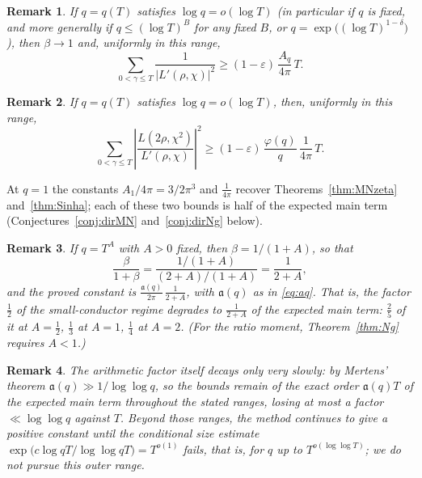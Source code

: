 \documentclass[10pt,a4paper]{amsart}
\newtheorem*{remark}{Remark}
\numberwithin{equation}{section}
\begin{document}
\begin{remark}
If $q=q(T)$ satisfies $\log q=o(\log T)$ (in particular if $q$ is fixed, and more generally if $q\le(\log T)^B$ for any fixed $B$, or $q=\exp\bigl((\log T)^{1-\delta}\bigr)$), then $\beta\to1$ and, uniformly in this range,
\[
\sum_{0<\gamma\le T}\frac{1}{|L'(\rho,\chi)|^2}\ge(1-\varepsilon)\,\frac{A_q}{4\pi}\,T .
\]
\end{remark}

\begin{remark}
If $q=q(T)$ satisfies $\log q=o(\log T)$, then, uniformly in this range,
\[
\sum_{0<\gamma\le T}\left|\frac{L(2\rho,\chi^2)}{L'(\rho,\chi)}\right|^2\ge(1-\varepsilon)\,\frac{\varphi(q)}{q}\,\frac{1}{4\pi}\,T .
\]
\end{remark}

At $q=1$ the constants $A_1/4\pi=3/2\pi^3$ and $\tfrac{1}{4\pi}$ recover Theorems~\ref{thm:MNzeta} and~\ref{thm:Sinha}; each of these two bounds is half of the expected main term (Conjectures~\ref{conj:dirMN} and~\ref{conj:dirNg} below).

\begin{remark}
If $q=T^{A}$ with $A>0$ fixed, then $\beta=1/(1+A)$, so that
\[
\frac{\beta}{1+\beta}=\frac{1/(1+A)}{(2+A)/(1+A)}=\frac{1}{2+A},
\]
and the proved constant is $\frac{\mathfrak a(q)}{2\pi}\,\frac{1}{2+A}$, with $\mathfrak a(q)$ as in \eqref{eq:aq}. That is, the factor $\tfrac12$ of the small-conductor regime degrades to $\tfrac{1}{2+A}$ of the expected main term: $\tfrac25$ of it at $A=\tfrac12$, $\tfrac13$ at $A=1$, $\tfrac14$ at $A=2$. (For the ratio moment, Theorem~\ref{thm:Ng} requires $A<1$.)
\end{remark}

\begin{remark}
The arithmetic factor itself decays only very slowly: by Mertens' theorem $\mathfrak a(q)\gg1/\log\log q$, so the bounds remain of the exact order $\mathfrak a(q)T$ of the expected main term throughout the stated ranges, losing at most a factor $\ll\log\log q$ against $T$. Beyond those ranges, the method continues to give a positive constant until the conditional size estimate $\exp\bigl(c\log qT/\log\log qT\bigr)=T^{o(1)}$ fails, that is, for $q$ up to $T^{o(\log\log T)}$; we do not pursue this outer range.
\end{remark}
\end{document}
